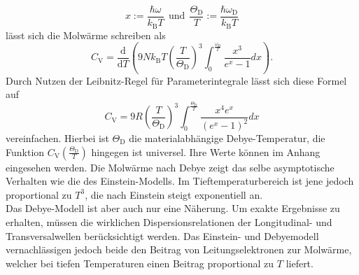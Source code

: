 \begin{equation}
  x := \frac{\hbar\omega}{k_{\text{B}}T} \:\: \text{und} \:\: \frac{\Theta_{\text{D}}}{T} := \frac{\hbar\omega_{\text{D}}}{k_{\text{B}}T} \label{eqn:4}
\end{equation}
lässt sich die Molwärme schreiben als
\begin{equation}
  C_{\text{V}} = \frac{\mathrm{d}}{\mathrm{d}T} \left( 9N k_{\text{B}}T \left(\frac{T}{\Theta_{\text{D}}}\right)^3 \int_{0}^{\frac{\omega_{\text{D}}}{T}}\frac{x^3}{e^x-1}dx\right).
\end{equation}
Durch Nutzen der Leibnitz-Regel für Parameterintegrale lässt sich diese Formel auf
\begin{equation}
  C_{\text{V}} = 9R \left(\frac{T}{\Theta_{\text{D}}}\right)^3 \int_{0}^{\frac{\Theta_{\text{D}}}{T}} \frac{x^4e^x}{\left(e^x-1\right)^2}dx
\end{equation}
vereinfachen.
Hierbei ist $\Theta_{\text{D}}$ die materialabhängige Debye-Temperatur, die Funktion $C_{\text{V}}\left(\frac{\Theta_{\text{D}}}{T}\right)$ hingegen ist universel.
Ihre Werte können im Anhang eingesehen werden.
Die Molwärme nach Debye zeigt das selbe asymptotische Verhalten wie die des Einstein-Modells.
Im Tieftemperaturbereich ist jene jedoch proportional zu $T^3$, die nach Einstein steigt exponentiell an.\\
Das Debye-Modell ist aber auch nur eine Näherung.
Um exakte Ergebnisse zu erhalten, müssen die wirklichen Dispersionsrelationen der Longitudinal- und Transversalwellen berücksichtigt werden.
Das Einstein- und Debyemodell vernachlässigen jedoch beide den Beitrag von Leitungselektronen zur Molwärme, welcher bei tiefen Temperaturen einen Beitrag proportional zu $T$ liefert.\cite{skript}
